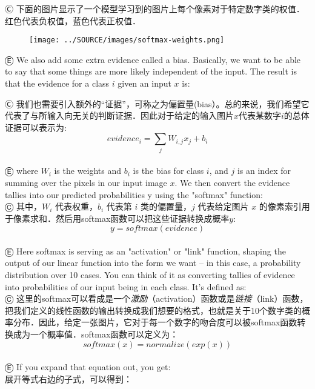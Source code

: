 Ⓒ 下面的图片显示了一个模型学习到的图片上每个像素对于特定数字类的权值．红色代表负权值，蓝色代表正权值．

\begin{figure}[htbp]
\centering
\texttt{[image: ../SOURCE/images/softmax-weights.png]}
\caption{}
\end{figure}

Ⓔ We also add some extra evidence called a bias. Basically, we want to be able to say that some things are more likely independent of the input. The result is that the evidence for a class $i$ given an input $x$ is:

Ⓒ 我们也需要引入额外的“证据”，可称之为偏置量(bias）。总的来说，我们希望它代表了与所输入向无关的判断证据．因此对于给定的输入图片$x$代表某数字$i$的总体证据可以表示为:
\begin{equation}
evidence_i = \sum_j{W_{i,j}}x_j+b_i
\end{equation}\\
Ⓔ where $W_i$ is the weights and $b_i$ is the bias for class $i$, and $j$ is an index for summing over the pixels in our input image $x$. We then convert the evidence tallies into our predicted probabilities y using the "softmax" function:\\
Ⓒ 其中，$W_i$ 代表权重，$b_i$ 代表第 $i$ 类的偏置量，$j$ 代表给定图片 $x$ 的像素索引用于像素求和．然后用softmax函数可以把这些证据转换成概率$y$:\\
\begin{equation}
y = softmax(evidence)
\end{equation}\\
Ⓔ Here softmax is serving as an "activation" or "link" function, shaping the output of our linear function into the form we want -- in this case, a probability distribution over 10 cases. You can think of it as converting tallies of evidence into probabilities of our input being in each class. It's defined as:\\
Ⓒ 这里的softmax可以看成是一个\emph{激励}（activation）函数或是\emph{链接}（link）函数，把我们定义的线性函数的输出转换成我们想要的格式，也就是关于10个数字类的概率分布．因此，给定一张图片，它对于每一个数字的吻合度可以被softmax函数转换成为一个概率值．softmax函数可以定义为：\\
\begin{equation}
softmax(x) = normalize(exp(x))
\end{equation}\\
Ⓔ If you expand that equation out, you get:\\
展开等式右边的子式，可以得到：\\

